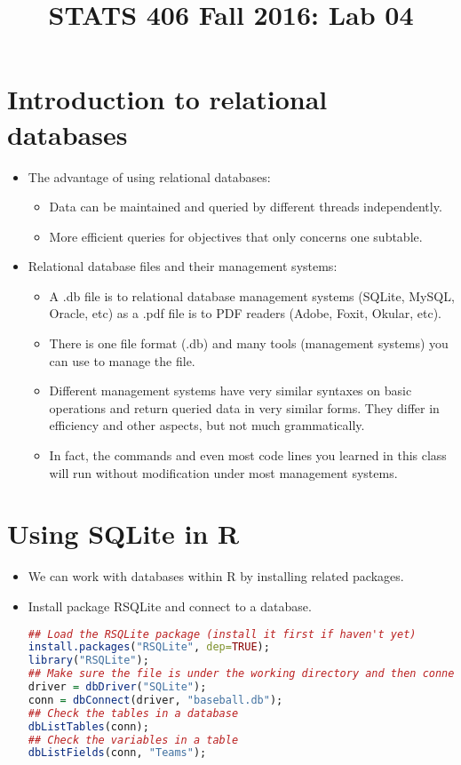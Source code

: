 \documentclass[12pt]{article}
\begin{document}
\title{\Large \bf STATS 406 Fall 2016: Lab 04}
\date{}

\maketitle

\section{Introduction to relational databases}
\begin{itemize}
	\item The advantage of using relational databases:
	\begin{itemize}[label=*]
		\item Data can be maintained and queried by different threads independently.
		\item More efficient queries for objectives that only concerns one subtable.
	\end{itemize}
	\item Relational database files and their management systems:
	\begin{itemize}[label=*]
		\item A .db file is to relational database management systems (SQLite, MySQL, Oracle, etc) as a .pdf file is to PDF readers (Adobe, Foxit, Okular, etc).
		\item There is one file format (.db) and many tools (management systems) you can use to manage the file.
		\item Different management systems have very similar syntaxes on basic operations and return queried data in very similar forms. They differ in efficiency and other aspects, but not much grammatically.
		\item In fact, the commands and even most code lines you learned in this class will run without modification under most management systems.
	\end{itemize}
\end{itemize}

\section{Using SQLite in R}
\begin{itemize}
	\item We can work with databases within R by installing related packages.
	\item Install package RSQLite and connect to a database.
\begin{lstlisting}[style=displaycode, language=R]
## Load the RSQLite package (install it first if haven't yet)
install.packages("RSQLite", dep=TRUE);
library("RSQLite");
## Make sure the file is under the working directory and then connect to it
driver = dbDriver("SQLite");
conn = dbConnect(driver, "baseball.db");
## Check the tables in a database
dbListTables(conn);
## Check the variables in a table
dbListFields(conn, "Teams");
\end{lstlisting}

\end{itemize}
\end{document}
